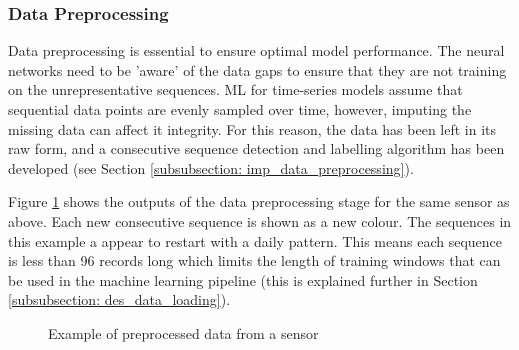 \subsubsection{Data Preprocessing}

Data preprocessing is essential to ensure optimal model performance. The neural networks need to be 'aware' of the data gaps to ensure that they are not training on the unrepresentative sequences. ML for time-series models assume that sequential data points are evenly sampled over time, however, imputing the missing data can affect it integrity. For this reason, the data has been left in its raw form, and a consecutive sequence detection and labelling algorithm has been developed (see Section \ref{subsubsection: imp_data_preprocessing}).

Figure \ref{fig:preprocessed_data_sequenced_example_timeseries} shows the outputs of the data preprocessing stage for the same sensor as above. Each new consecutive sequence is shown as a new colour. The sequences in this example a appear to restart with a daily pattern. This means each sequence is less than 96 records long which limits the length of training windows that can be used in the machine learning pipeline (this is explained further in Section \ref{subsubsection: des_data_loading}).


\begin{figure}[H]
    \centering
    \caption{Example of preprocessed data from a sensor}
    \label{fig:preprocessed_data_sequenced_example_timeseries}
\end{figure}

